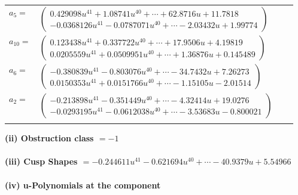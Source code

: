 \documentclass[1p]{elsarticle_modified}
\theoremstyle{definition}
\begin{document}
\begin{tabular}{m{7pt} m{180pt} m{7pt} m{180pt} }
\flushright $a_{5}=$&$\begin{pmatrix}0.429098 u^{41}+1.08741 u^{40}+\cdots+62.8716 u+11.7818\\-0.0368126 u^{41}-0.0787071 u^{40}+\cdots-2.03432 u+1.99774\end{pmatrix}$ \\
\flushright $a_{10}=$&$\begin{pmatrix}0.123438 u^{41}+0.337722 u^{40}+\cdots+17.9506 u+4.19819\\0.0205559 u^{41}+0.0509951 u^{40}+\cdots+1.36876 u+0.145489\end{pmatrix}$ \\
\flushright $a_{6}=$&$\begin{pmatrix}-0.380839 u^{41}-0.803076 u^{40}+\cdots-34.7432 u+7.26273\\0.0150353 u^{41}+0.0151766 u^{40}+\cdots-1.15105 u-2.01514\end{pmatrix}$ \\
\flushright $a_{2}=$&$\begin{pmatrix}-0.213898 u^{41}-0.351449 u^{40}+\cdots-4.32414 u+19.0276\\-0.0293195 u^{41}-0.0612038 u^{40}+\cdots-3.53683 u-0.800021\end{pmatrix}$\\&\end{tabular}
\flushleft \textbf{(ii) Obstruction class $= -1$}\\~\\
\flushleft \textbf{(iii) Cusp Shapes $= -0.244611 u^{41}-0.621694 u^{40}+\cdots-40.9379 u+5.54966$}\\~\\
\newpage\renewcommand{\arraystretch}{1}
\flushleft \textbf{(iv) u-Polynomials at the component}\newline \\
\end{document}
